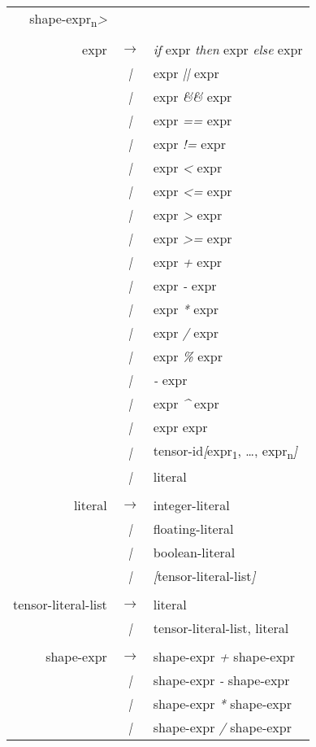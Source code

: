 \begin{tt}
{\begin{center}
\begin{longtable}{r c l}
              shape-expr\textsubscript{n}\emph{>} \\
 & & \\
expr & $\rightarrow$ & \emph{if} expr \emph{then} expr \emph{else} expr \\
& \emph{|} & expr \emph{||} expr \\
& \emph{|} & expr \emph{\&\&} expr \\
& \emph{|} & expr \emph{==} expr \\
& \emph{|} & expr \emph{!=} expr \\
& \emph{|} & expr \emph{<} expr \\
& \emph{|} & expr \emph{<=} expr \\
& \emph{|} & expr \emph{>} expr \\
& \emph{|} & expr \emph{>=} expr \\
& \emph{|} & expr \emph{+} expr \\
& \emph{|} & expr \emph{-} expr \\
& \emph{|} & expr \emph{*} expr \\
& \emph{|} & expr \emph{/} expr \\
& \emph{|} & expr \emph{\%} expr \\
& \emph{|} & \emph{-} expr \\
& \emph{|} & expr \emph{\^} expr \\
& \emph{|} & expr expr \\
& \emph{|} & tensor-id\emph{[}expr\textsubscript{1}, \ldots, expr\textsubscript{n}\emph{]} \\
& \emph{|} & literal \\
& & \\
literal & $\rightarrow$ &  integer-literal \\
& \emph{|} & floating-literal \\
& \emph{|} & boolean-literal \\
& \emph{|} & \emph{[}tensor-literal-list\emph{]} \\
& & \\
tensor-literal-list & $\rightarrow$ & 
        literal\\
& \emph{|} & tensor-literal-list, literal\\
& & \\
shape-expr & $\rightarrow$ & shape-expr \emph{+} shape-expr \\
& \emph{|} & shape-expr \emph{-} shape-expr \\
& \emph{|} & shape-expr \emph{*} shape-expr \\
& \emph{|} & shape-expr \emph{/} shape-expr \\

\end{longtable}
\end{center}}
\end{tt}
